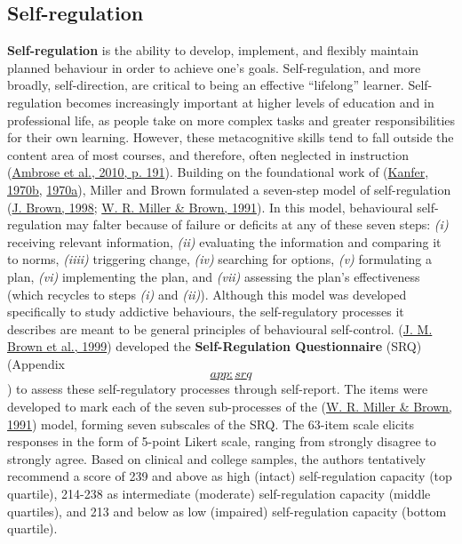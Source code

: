 \documentclass[a4paper, nobind]{templates/ociamthesis}
\begin{document}
\hypertarget{sec:bg_learn_self_regulation}{%
\subsection{Self-regulation}\label{sec:bg_learn_self_regulation}}

\textbf{Self-regulation} is the ability to develop, implement, and flexibly
maintain planned behaviour in order to achieve one's goals.
Self-regulation, and more broadly, self-direction, are critical to being
an effective ``lifelong'' learner. Self-regulation becomes increasingly
important at higher levels of education and in professional life, as
people take on more complex tasks and greater responsibilities for their
own learning. However, these metacognitive skills tend to fall outside
the content area of most courses, and therefore, often neglected in
instruction (\protect\hyperlink{ref-ambrose2010howa}{Ambrose et al., 2010, p. 191}). Building on the foundational work
of (\protect\hyperlink{ref-kanfer1970self_a}{Kanfer, 1970b}, \protect\hyperlink{ref-kanfer1970self_b}{1970a}), Miller and Brown formulated a
seven-step model of self-regulation (\protect\hyperlink{ref-brown1998self}{J. Brown, 1998}; \protect\hyperlink{ref-miller1991self}{W. R. Miller \& Brown, 1991}).
In this model, behavioural self-regulation may falter because of failure
or deficits at any of these seven steps: \emph{(i)} receiving relevant
information, \emph{(ii)} evaluating the information and comparing it to
norms, \emph{(iiii)} triggering change, \emph{(iv)} searching for options, \emph{(v)}
formulating a plan, \emph{(vi)} implementing the plan, and \emph{(vii)} assessing
the plan's effectiveness (which recycles to steps \emph{(i)} and \emph{(ii)}).
Although this model was developed specifically to study addictive
behaviours, the self-regulatory processes it describes are meant to be
general principles of behavioural self-control. (\protect\hyperlink{ref-brown1999self}{J. M. Brown et al., 1999})
developed the \textbf{Self-Regulation Questionnaire} (SRQ) (Appendix
\protect\hyperlink{app:srq}{\[app:srq\]}) to
assess these self-regulatory processes through self-report. The items
were developed to mark each of the seven sub-processes of the
(\protect\hyperlink{ref-miller1991self}{W. R. Miller \& Brown, 1991}) model, forming seven subscales of the SRQ. The 63-item
scale elicits responses in the form of 5-point Likert scale, ranging
from strongly disagree to strongly agree. Based on clinical and college
samples, the authors tentatively recommend a score of 239 and above as
high (intact) self-regulation capacity (top quartile), 214-238 as
intermediate (moderate) self-regulation capacity (middle quartiles), and
213 and below as low (impaired) self-regulation capacity (bottom
quartile).
\end{document}
